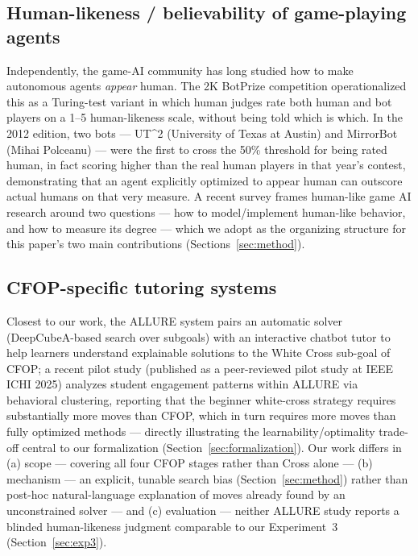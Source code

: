 \documentclass[10pt,conference]{article}
\begin{document}
\subsection{Human-likeness / believability of game-playing agents}
\label{sec:related-believability}
Independently, the game-AI community has long studied how to make
autonomous agents \emph{appear} human. The 2K BotPrize competition
\citep{hingston2009} operationalized this as a Turing-test variant in
which human judges rate both human and bot players on a 1--5
human-likeness scale, without being told which is which. In the 2012
edition, two bots --- UT\^{}2 (University of Texas at Austin) and
MirrorBot (Mihai Polceanu) --- were the first to cross the 50\%
threshold for being rated human, in fact scoring higher than the
real human players in that year's contest, demonstrating that an
agent explicitly optimized to appear human can outscore actual
humans on that very measure. A recent survey \citep{humanlike2025} frames
human-like game AI research around two questions --- how to
model/implement human-like behavior, and how to measure its degree
--- which we adopt as the organizing structure for this paper's two
main contributions (Sections~\ref{sec:method}).

\subsection{CFOP-specific tutoring systems}
\label{sec:related-allure}
Closest to our work, the ALLURE system \citep{allure} pairs an
automatic solver (DeepCubeA-based search over subgoals) with an
interactive chatbot tutor to help learners understand explainable
solutions to the White Cross sub-goal of CFOP; a recent pilot study
\citep{vanacore2025} (published as a peer-reviewed pilot study at
IEEE ICHI 2025)
analyzes student engagement patterns within ALLURE via behavioral
clustering, reporting that the beginner white-cross strategy
requires substantially more moves than CFOP, which in turn requires
more moves than fully optimized methods --- directly
illustrating the learnability/optimality trade-off central to our
formalization (Section~\ref{sec:formalization}). Our work differs in
(a) scope --- covering all four CFOP stages rather than Cross alone
--- (b) mechanism --- an explicit, tunable search bias
(Section~\ref{sec:method}) rather than post-hoc natural-language
explanation of moves already found by an unconstrained solver ---
and (c) evaluation --- neither ALLURE study reports a blinded
human-likeness judgment comparable to our Experiment~3
(Section~\ref{sec:exp3}).
\end{document}
